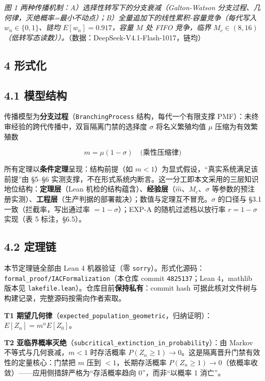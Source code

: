 \documentclass[
]{ctexart}
\begin{document}
\emph{图 1 两种传播机制：A）选择性转写下的分支衰减（Galton-Watson
分支过程、几何律，灭绝概率=最小不动点）；B）全量追加下的线性累积-容量竞争（每代写入
\(w_n\in\{0,1\}\)、链均 \(E[w_n]=0.917\)，容量 \(M\) 处 FIFO 竞争，临界
\(M_c\in(8,16)\)（低转写态读数））。}（数据：DeepSeek-V4.1-Flash-1017，链均）

\subsection{4 形式化}\label{ux5f62ux5f0fux5316}

\subsection{4.1 模型结构}\label{ux6a21ux578bux7ed3ux6784}

传播模型为\textbf{分支过程}（\texttt{BranchingProcess}
结构，每代一个有限支撑
PMF）：未终审经验的跨代传播中，双盲隔离门禁的选择度 \(\sigma\)
将名义繁殖均值 \(\mu\) 压缩为有效繁殖数

\[m = \mu(1-\sigma) \quad \text{(乘性压缩律)}\]

所有定理以\textbf{条件定理}呈现：结构前提（如
\(m<1\)）为显式假设，``真实系统满足该前提''由 §5--§6
实测支撑，不在形式系统内断言。这一分工即本文采用的三层知识地位结构：\textbf{定理层}（Lean
机检的结构蕴含）、\textbf{经验层}（\(\hat m\)、\(M_c\)、\(\sigma\)
等参数的预注册实测）、\textbf{工程层}（生产判据的部署裁决）；数值与定理互不冒充。\(\sigma\)
的口径与 §3.1 一致（拦截率，写出通过率 \(=1-\sigma\)）；EXP-A
的随机过滤档以放行率 \(r=1-\sigma\) 实现（表 5 标注，§6.5）。

\subsection{4.2 定理链}\label{ux5b9aux7406ux94fe}

本节定理链全部由 Lean 4 机器验证（零
\texttt{sorry}）。形式化源码：\texttt{formal\_proof/IACFormalization}（本仓库
commit \texttt{4825137}；Lean 4，mathlib 版本见
\texttt{lakefile.lean}）。仓库目前\textbf{保持私有}：commit hash
可据此核对文件树与构建记录，完整源码按需向作者索取。

\textbf{T1
期望几何律}（\texttt{expected\_population\_geometric}，归纳证明）：\(E[Z_n]=m^n E[Z_0]\)。

\textbf{T2
亚临界概率灭绝}（\texttt{subcritical\_extinction\_in\_probability}）：由
Markov 不等式与几何衰减，\(m<1\) 时存活概率
\(P(Z_n\ge1)\to0\)。这是隔离晋升门禁有效性的定量核心：门禁把 \(m\) 压到
\(<1\)，长期存活概率
\(P(Z_n\ge1)\to0\)（依概率收敛）------应用侧措辞严格为``存活概率趋向
0''，而非``以概率 1 消亡''。
\end{document}
